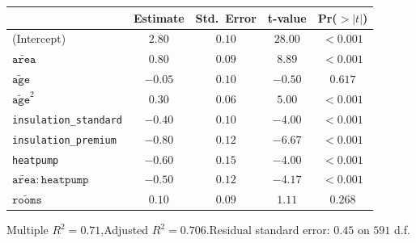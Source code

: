 \documentclass[11pt,a4paper]{article}
\begin{document}
\begin{center}\small
\begin{tabular}{lcccc}
\toprule
 & \textbf{Estimate} & \textbf{Std.\ Error} & \textbf{t-value} & \textbf{Pr($>|t|$)} \\
\midrule
(Intercept)                         & $2.80$   & $0.10$  & $28.00$   & $<0.001$ \\
$\widetilde{\texttt{area}}$         & $0.80$   & $0.09$  & $8.89$    & $<0.001$ \\
$\widetilde{\texttt{age}}$          & $-0.05$  & $0.10$  & $-0.50$   & $0.617$  \\
$\widetilde{\texttt{age}}^2$        & $0.30$   & $0.06$  & $5.00$    & $<0.001$ \\
\texttt{insulation\_standard}       & $-0.40$  & $0.10$  & $-4.00$   & $<0.001$ \\
\texttt{insulation\_premium}        & $-0.80$  & $0.12$  & $-6.67$   & $<0.001$ \\
\texttt{heatpump}                   & $-0.60$  & $0.15$  & $-4.00$   & $<0.001$ \\
$\widetilde{\texttt{area}}\!:\!\texttt{heatpump}$ & $-0.50$  & $0.12$  & $-4.17$  & $<0.001$ \\
$\widetilde{\texttt{rooms}}$        & $0.10$   & $0.09$  & $1.11$    & $0.268$  \\
\bottomrule
\end{tabular}
\end{center}

\noindent Multiple $R^2 = 0.71$,\quad Adjusted $R^2 = 0.706$.\quad Residual standard error: $0.45$ on $591$ d.f.

\medskip
\end{document}
